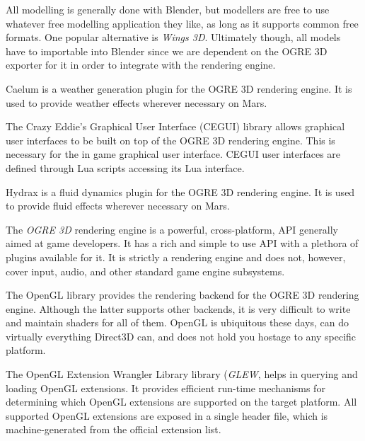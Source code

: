 
\startitemize[4]

All modelling is generally done with Blender, but modellers are free to use whatever free modelling application they like, as long as it supports common free formats. One popular alternative is {\it Wings 3D}. Ultimately though, all models have to importable into Blender since we are dependent on the OGRE 3D exporter for it in order to integrate with the rendering engine.


Caelum is a weather generation plugin for the OGRE 3D rendering engine. It is used to provide weather effects wherever necessary on Mars.


The Crazy Eddie's Graphical User Interface (CEGUI) library allows graphical user interfaces to be built on top of the OGRE 3D rendering engine. This is necessary for the in game graphical user interface. CEGUI user interfaces are defined through Lua scripts accessing its Lua interface.


Hydrax is a fluid dynamics plugin for the OGRE 3D rendering engine. It is used to provide fluid effects wherever necessary on Mars.


The {\it OGRE 3D} rendering engine is a powerful, cross-platform, API generally aimed at game developers. It has a rich and simple to use API with a plethora of plugins available for it. It is strictly a rendering engine and does not, however, cover input, audio, and other standard game engine subsystems.


The OpenGL library provides the rendering backend for the OGRE 3D rendering engine. Although the latter supports other backends, it is very difficult to write and maintain shaders for all of them. OpenGL is ubiquitous these days, can do virtually everything Direct3D can, and does not hold you hostage to any specific platform.


The OpenGL Extension Wrangler Library library ({\it GLEW}, helps in querying and loading OpenGL extensions. It provides efficient run-time mechanisms for determining which OpenGL extensions are supported on the target platform. All supported OpenGL extensions are exposed in a single header file, which is machine-generated from the official extension list.

